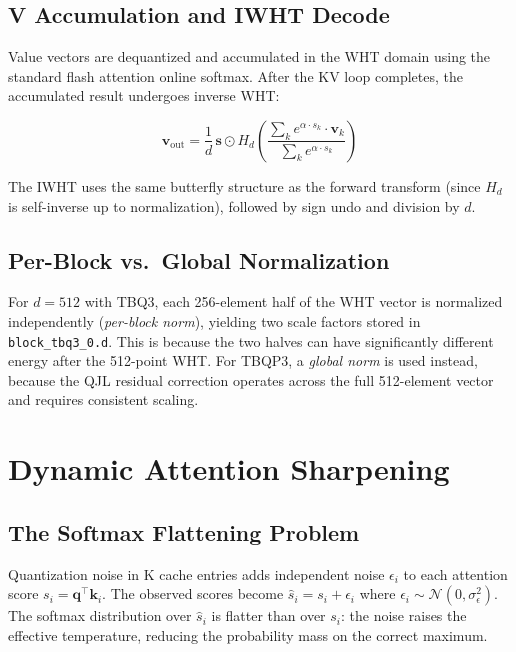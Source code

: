 \documentclass[10pt,twocolumn]{article}
\begin{document}
\subsection{V Accumulation and IWHT Decode}

Value vectors are dequantized and accumulated in the WHT domain using the standard flash attention online softmax. After the KV loop completes, the accumulated result undergoes inverse WHT:

\begin{equation}
\mathbf{v}_\text{out} = \frac{1}{d}\,\mathbf{s} \odot H_d\!\left(\frac{\sum_k e^{\alpha \cdot s_k} \cdot \mathbf{v}_k}{\sum_k e^{\alpha \cdot s_k}}\right)
\end{equation}

The IWHT uses the same butterfly structure as the forward transform (since $H_d$ is self-inverse up to normalization), followed by sign undo and division by $d$.

\subsection{Per-Block vs.\ Global Normalization}

For $d=512$ with TBQ3, each 256-element half of the WHT vector is normalized independently (\emph{per-block norm}), yielding two scale factors stored in \texttt{block\_tbq3\_0.d}. This is because the two halves can have significantly different energy after the 512-point WHT. For TBQP3, a \emph{global norm} is used instead, because the QJL residual correction operates across the full 512-element vector and requires consistent scaling.

\section{Dynamic Attention Sharpening}
\label{sec:sharpening}

\subsection{The Softmax Flattening Problem}

Quantization noise in K cache entries adds independent noise $\epsilon_i$ to each attention score $s_i = \mathbf{q}^\top \mathbf{k}_i$. The observed scores become $\hat{s}_i = s_i + \epsilon_i$ where $\epsilon_i \sim \mathcal{N}(0, \sigma_\epsilon^2)$. The softmax distribution over $\hat{s}_i$ is flatter than over $s_i$: the noise raises the effective temperature, reducing the probability mass on the correct maximum.
\end{document}
